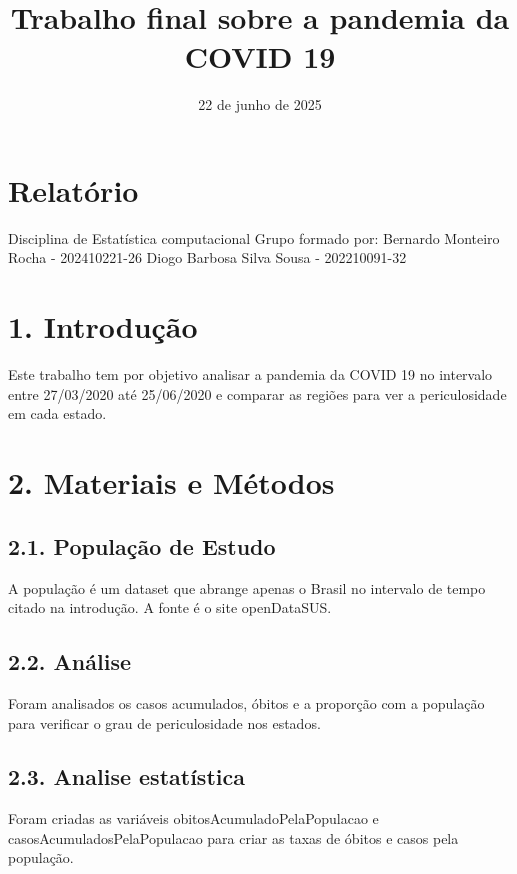 \documentclass[
]{article}
\title{Trabalho final sobre a pandemia da COVID 19}
\author{}
\date{\vspace{-2.5em}22 de junho de 2025}
\begin{document}
\maketitle

\section{Relatório}\label{relatuxf3rio}

Disciplina de Estatística computacional Grupo formado por: Bernardo
Monteiro Rocha - 202410221-26 Diogo Barbosa Silva Sousa - 202210091-32

\section{1. Introdução}\label{introduuxe7uxe3o}

Este trabalho tem por objetivo analisar a pandemia da COVID 19 no
intervalo entre 27/03/2020 até 25/06/2020 e comparar as regiões para ver
a periculosidade em cada estado.

\section{2. Materiais e Métodos}\label{materiais-e-muxe9todos}

\subsection{2.1. População de Estudo}\label{populauxe7uxe3o-de-estudo}

A população é um dataset que abrange apenas o Brasil no intervalo de
tempo citado na introdução. A fonte é o site openDataSUS.

\subsection{2.2. Análise}\label{anuxe1lise}

Foram analisados os casos acumulados, óbitos e a proporção com a
população para verificar o grau de periculosidade nos estados.

\subsection{2.3. Analise estatística}\label{analise-estatuxedstica}

Foram criadas as variáveis obitosAcumuladoPelaPopulacao e
casosAcumuladosPelaPopulacao para criar as taxas de óbitos e casos pela
população.
\end{document}
